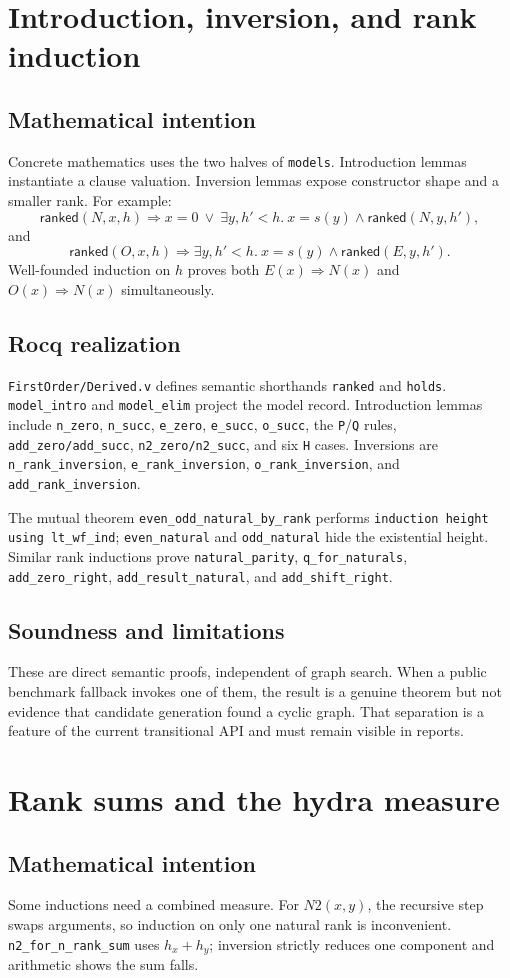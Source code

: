 \documentclass[11pt,oneside]{book}
\DeclareRobustCommand{\code}[1]{\nolinkurl{#1}}
\DeclareRobustCommand{\file}[1]{\nolinkurl{#1}}
\newcommand{\mathintent}{\subsection*{Mathematical intention}}
\newcommand{\rocqreal}{\subsection*{Rocq realization}}
\newcommand{\soundlim}{\subsection*{Soundness and limitations}}
\begin{document}
\section{Introduction, inversion, and rank induction}

\mathintent

Concrete mathematics uses the two halves of \code{models}.  Introduction
lemmas instantiate a clause valuation.  Inversion lemmas expose constructor
shape and a smaller rank.  For example:
\[
 \mathsf{ranked}(N,x,h)\Rightarrow
 x=0\ \lor\ \exists y,h'<h.\ x=s(y)\land\mathsf{ranked}(N,y,h'),
\]
and
\[
 \mathsf{ranked}(O,x,h)\Rightarrow
 \exists y,h'<h.\ x=s(y)\land\mathsf{ranked}(E,y,h').
\]
Well-founded induction on \(h\) proves both \(E(x)\Rightarrow N(x)\) and
\(O(x)\Rightarrow N(x)\) simultaneously.

\rocqreal

\file{FirstOrder/Derived.v} defines semantic shorthands \code{ranked} and
\code{holds}.  \code{model_intro} and \code{model_elim} project the model
record.  Introduction lemmas include \code{n_zero}, \code{n_succ},
\code{e_zero}, \code{e_succ}, \code{o_succ}, the \code{P}/\code{Q} rules,
\code{add_zero/add_succ}, \code{n2_zero/n2_succ}, and six \code{H} cases.
Inversions are \code{n_rank_inversion}, \code{e_rank_inversion},
\code{o_rank_inversion}, and \code{add_rank_inversion}.

The mutual theorem \code{even_odd_natural_by_rank} performs
\code{induction height using lt_wf_ind}; \code{even_natural} and
\code{odd_natural} hide the existential height.  Similar rank inductions prove
\code{natural_parity}, \code{q_for_naturals}, \code{add_zero_right},
\code{add_result_natural}, and \code{add_shift_right}.

\soundlim

These are direct semantic proofs, independent of graph search.  When a public
benchmark fallback invokes one of them, the result is a genuine theorem but
not evidence that candidate generation found a cyclic graph.  That separation
is a feature of the current transitional API and must remain visible in reports.

\section{Rank sums and the hydra measure}

\mathintent

Some inductions need a combined measure.  For \(N2(x,y)\), the recursive step
swaps arguments, so induction on only one natural rank is inconvenient.
\code{n2_for_n_rank_sum} uses \(h_x+h_y\); inversion strictly reduces one
component and arithmetic shows the sum falls.
\end{document}
